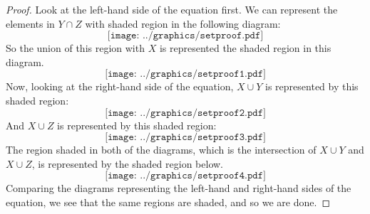 \begin{proof} 
Look at the left-hand side of the equation first. We can represent the
elements in $Y\cap Z$ with shaded region in the following diagram:
\[
\texttt{[image: ../graphics/setproof.pdf]}
\]
So the union of this region with $X$ is represented the shaded
region in this diagram.
\[
\texttt{[image: ../graphics/setproof1.pdf]}
\]
Now, looking at the right-hand side of the equation, $X\cup Y$ is
represented by this shaded region:
\[
\texttt{[image: ../graphics/setproof2.pdf]}
\]
And $X\cup Z$ is represented by this shaded region:
\[
\texttt{[image: ../graphics/setproof3.pdf]}
\]
The region shaded in both of the diagrams, which is the
intersection of $X\cup Y$ and $X\cup Z$, is represented by the shaded
region below.
\[
\texttt{[image: ../graphics/setproof4.pdf]}
\]
Comparing the diagrams representing the left-hand and right-hand sides
of the equation, we see that the same regions are shaded, and so we
are done.
\end{proof}

